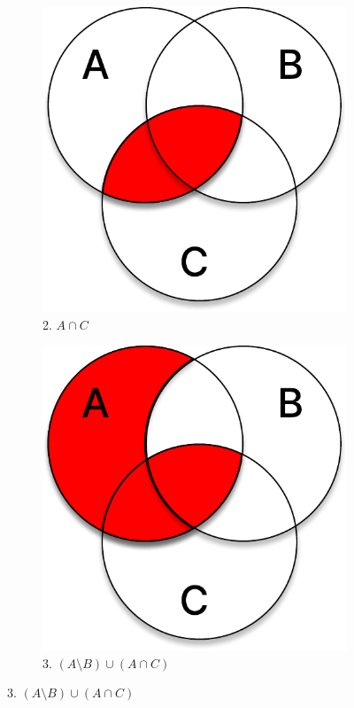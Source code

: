 \documentclass[11pt]{article}
\begin{document}
\begin{figure}[h]
\begin{subfigure}{.32\textwidth}
                \includegraphics[width=1\linewidth]{t3_1_2.pdf}
                \caption{2. $A\cap C$}
        \end{subfigure}
        \begin{subfigure}{.33\textwidth}
                \centering
                \includegraphics[width=1\linewidth]{t3_1_3.pdf}
                \caption{3. $(A \setminus B) \cup (A \cap C)$}
        \end{subfigure}
\end{figure}
\end{document}
